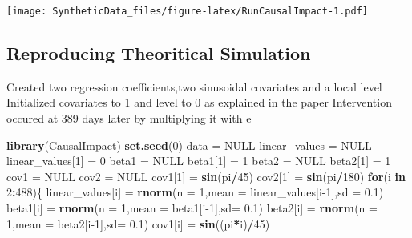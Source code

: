 \documentclass[
]{article}
\newenvironment{Shaded}{\begin{snugshade}}{\end{snugshade}}
\newcommand{\ControlFlowTok}[1]{\textcolor[rgb]{0.13,0.29,0.53}{\textbf{#1}}}
\newcommand{\DataTypeTok}[1]{\textcolor[rgb]{0.13,0.29,0.53}{#1}}
\newcommand{\DecValTok}[1]{\textcolor[rgb]{0.00,0.00,0.81}{#1}}
\newcommand{\FloatTok}[1]{\textcolor[rgb]{0.00,0.00,0.81}{#1}}
\newcommand{\KeywordTok}[1]{\textcolor[rgb]{0.13,0.29,0.53}{\textbf{#1}}}
\newcommand{\NormalTok}[1]{#1}
\newcommand{\OperatorTok}[1]{\textcolor[rgb]{0.81,0.36,0.00}{\textbf{#1}}}
\newcommand{\OtherTok}[1]{\textcolor[rgb]{0.56,0.35,0.01}{#1}}
\newcommand{\StringTok}[1]{\textcolor[rgb]{0.31,0.60,0.02}{#1}}
\begin{document}
\texttt{[image: SyntheticData\_files/figure-latex/RunCausalImpact-1.pdf]}

\hypertarget{reproducing-theoritical-simulation}{%
\subsection{Reproducing Theoritical
Simulation}\label{reproducing-theoritical-simulation}}

Created two regression coefficients,two sinusoidal covariates and a
local level Initialized covariates to 1 and level to 0 as explained in
the paper Intervention occured at 389 days later by multiplying it with
e

\begin{Shaded}
\begin{Highlighting}[]
\KeywordTok{library}\NormalTok{(CausalImpact)}
\KeywordTok{set.seed}\NormalTok{(}\DecValTok{0}\NormalTok{)}
\NormalTok{data =}\StringTok{ }\OtherTok{NULL}
\NormalTok{linear_values =}\StringTok{ }\OtherTok{NULL}
\NormalTok{linear_values[}\DecValTok{1}\NormalTok{] =}\StringTok{ }\DecValTok{0}
\NormalTok{beta1 =}\StringTok{ }\OtherTok{NULL}
\NormalTok{beta1[}\DecValTok{1}\NormalTok{] =}\StringTok{ }\DecValTok{1}
\NormalTok{beta2 =}\StringTok{ }\OtherTok{NULL}
\NormalTok{beta2[}\DecValTok{1}\NormalTok{] =}\StringTok{ }\DecValTok{1}
\NormalTok{cov1 =}\StringTok{ }\OtherTok{NULL}
\NormalTok{cov2 =}\StringTok{ }\OtherTok{NULL}
\NormalTok{cov1[}\DecValTok{1}\NormalTok{] =}\StringTok{ }\KeywordTok{sin}\NormalTok{(pi}\OperatorTok{/}\DecValTok{45}\NormalTok{)}
\NormalTok{cov2[}\DecValTok{1}\NormalTok{] =}\StringTok{ }\KeywordTok{sin}\NormalTok{(pi}\OperatorTok{/}\DecValTok{180}\NormalTok{)}
\ControlFlowTok{for}\NormalTok{(i }\ControlFlowTok{in} \DecValTok{2}\OperatorTok{:}\DecValTok{488}\NormalTok{)\{}
\NormalTok{  linear_values[i] =}\StringTok{ }\KeywordTok{rnorm}\NormalTok{(}\DataTypeTok{n =} \DecValTok{1}\NormalTok{,}\DataTypeTok{mean =}\NormalTok{ linear_values[i}\DecValTok{-1}\NormalTok{],}\DataTypeTok{sd =} \FloatTok{0.1}\NormalTok{)}
\NormalTok{  beta1[i] =}\StringTok{ }\KeywordTok{rnorm}\NormalTok{(}\DataTypeTok{n =} \DecValTok{1}\NormalTok{,}\DataTypeTok{mean =}\NormalTok{ beta1[i}\DecValTok{-1}\NormalTok{],}\DataTypeTok{sd=} \FloatTok{0.1}\NormalTok{)}
\NormalTok{  beta2[i] =}\StringTok{ }\KeywordTok{rnorm}\NormalTok{(}\DataTypeTok{n =} \DecValTok{1}\NormalTok{,}\DataTypeTok{mean =}\NormalTok{ beta2[i}\DecValTok{-1}\NormalTok{],}\DataTypeTok{sd=} \FloatTok{0.1}\NormalTok{)}
\NormalTok{  cov1[i] =}\StringTok{ }\KeywordTok{sin}\NormalTok{((pi}\OperatorTok{*}\NormalTok{i)}\OperatorTok{/}\DecValTok{45}\NormalTok{)}

\end{Highlighting}
\end{Shaded}
\end{document}
